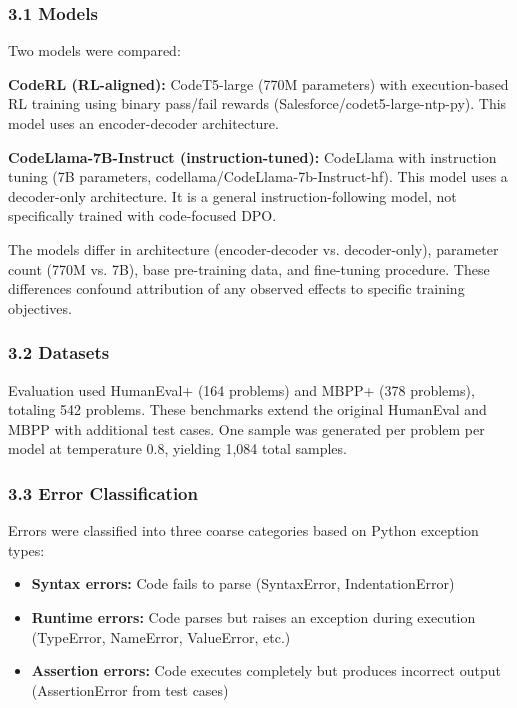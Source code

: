 
\subsubsection{3.1 Models}

Two models were compared:

\textbf{CodeRL (RL-aligned):} CodeT5-large (770M parameters) with execution-based RL training using binary pass/fail rewards (Salesforce/codet5-large-ntp-py). This model uses an encoder-decoder architecture.

\textbf{CodeLlama-7B-Instruct (instruction-tuned):} CodeLlama with instruction tuning (7B parameters, codellama/CodeLlama-7b-Instruct-hf). This model uses a decoder-only architecture. It is a general instruction-following model, not specifically trained with code-focused DPO.

The models differ in architecture (encoder-decoder vs. decoder-only), parameter count (770M vs. 7B), base pre-training data, and fine-tuning procedure. These differences confound attribution of any observed effects to specific training objectives.

\subsubsection{3.2 Datasets}

Evaluation used HumanEval+ (164 problems) and MBPP+ (378 problems), totaling 542 problems. These benchmarks extend the original HumanEval and MBPP with additional test cases. One sample was generated per problem per model at temperature 0.8, yielding 1,084 total samples.

\subsubsection{3.3 Error Classification}

Errors were classified into three coarse categories based on Python exception types:
\begin{itemize}
\item \textbf{Syntax errors:} Code fails to parse (SyntaxError, IndentationError)
\item \textbf{Runtime errors:} Code parses but raises an exception during execution (TypeError, NameError, ValueError, etc.)
\item \textbf{Assertion errors:} Code executes completely but produces incorrect output (AssertionError from test cases)
\end{itemize}

